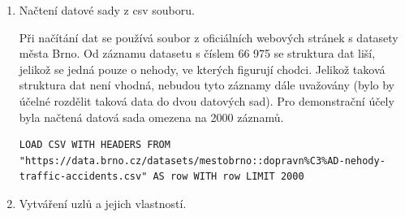 \documentclass[a4paper, 11pt]{article}
\begin{document}
    \begin{enumerate}
        \item Načtení datové sady z csv souboru.
        
        Při načítání dat se používá soubor z oficiálních webových stránek s datasety města Brno. Od záznamu datasetu s číslem 66 975 se struktura dat liší, jelikož se jedná pouze o nehody, ve kterých figurují chodci. Jelikož taková struktura dat není vhodná, nebudou tyto záznamy dále uvažovány (bylo by účelné rozdělit taková data do dvou datových sad). Pro demonstrační účely byla načtená datová sada omezena na 2000 záznamů.
        
    \begin{lstlisting}[style=Cypher]
        LOAD CSV WITH HEADERS FROM "https://data.brno.cz/datasets/mestobrno::dopravn%C3%AD-nehody-traffic-accidents.csv" AS row WITH row LIMIT 2000
    \end{lstlisting}

        \item Vytváření uzlů a jejich vlastností.


\end{enumerate}
\end{document}
